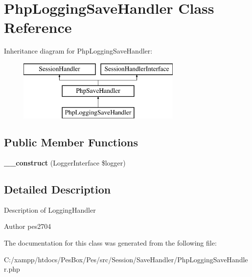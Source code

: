 \hypertarget{class_pes_1_1_session_1_1_save_handler_1_1_php_logging_save_handler}{}\section{Php\+Logging\+Save\+Handler Class Reference}
\label{class_pes_1_1_session_1_1_save_handler_1_1_php_logging_save_handler}
Inheritance diagram for Php\+Logging\+Save\+Handler\+:\begin{figure}[H]
\begin{center}
\leavevmode
\includegraphics[height=3.000000cm]{class_pes_1_1_session_1_1_save_handler_1_1_php_logging_save_handler}
\end{center}
\end{figure}
\subsection*{Public Member Functions}
\begin{DoxyCompactItemize}
\item 
\mbox{\label{class_pes_1_1_session_1_1_save_handler_1_1_php_logging_save_handler_a2bd426f7ee55a596b1893454a77a006a}} 
{\bfseries \+\_\+\+\_\+construct} (Logger\+Interface \$logger)
\end{DoxyCompactItemize}


\subsection{Detailed Description}
Description of Logging\+Handler

\begin{DoxyAuthor}{Author}
pes2704 
\end{DoxyAuthor}


The documentation for this class was generated from the following file\+:\begin{DoxyCompactItemize}
\item 
C\+:/xampp/htdocs/\+Pes\+Box/\+Pes/src/\+Session/\+Save\+Handler/Php\+Logging\+Save\+Handler.\+php\end{DoxyCompactItemize}
